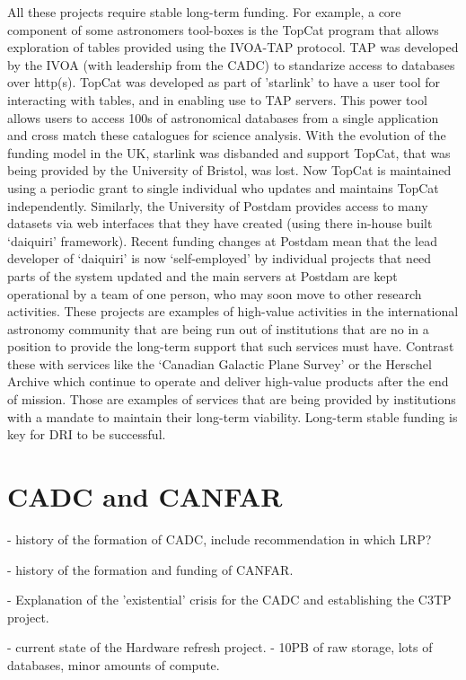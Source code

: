 \documentclass[11pt]{article}
\begin{document}
All these projects require stable long-term funding.  For example, a core component of some astronomers tool-boxes is the TopCat program that allows exploration of tables provided using the IVOA-TAP protocol.  TAP was developed by the IVOA (with leadership from the CADC) to standarize access to databases over http(s).  TopCat was developed as part of 'starlink' to have a user tool for interacting with tables, and in enabling use to TAP servers.  This power tool allows users to access 100s of astronomical databases from a single application and cross match these catalogues for science analysis.   With the evolution of the funding model in the UK, starlink was disbanded and support TopCat, that was being provided by the University of Bristol, was lost.  Now TopCat is maintained using a periodic grant to  single individual who updates and maintains TopCat independently.  Similarly, the University of Postdam provides access to many datasets via web interfaces that they have created (using there in-house built `daiquiri' framework).  Recent funding changes at Postdam mean that the lead developer of `daiquiri' is now `self-employed' by individual projects that need parts of the system updated and the main servers at Postdam are kept operational by a team of one person, who may soon move to other research activities.  
These projects are examples of high-value activities in the international astronomy community that are being run out of institutions that are no in a position to provide the long-term support that such services must have.  
Contrast these with services like the `Canadian Galactic Plane Survey' or the Herschel Archive which continue to operate and deliver high-value products after the end of mission.  Those are examples of services that are being provided by institutions with a mandate to maintain their long-term viability. 
Long-term stable funding is key for DRI to be successful.


\section{CADC and CANFAR}
 - history of the formation of CADC, include recommendation in which LRP?

 - history of the formation  and funding of CANFAR.

 - Explanation of the 'existential' crisis for the CADC and establishing the C3TP project.

 - current state of the Hardware refresh project.  - 10PB of raw storage, lots of databases, minor amounts of compute.  
\end{document}
